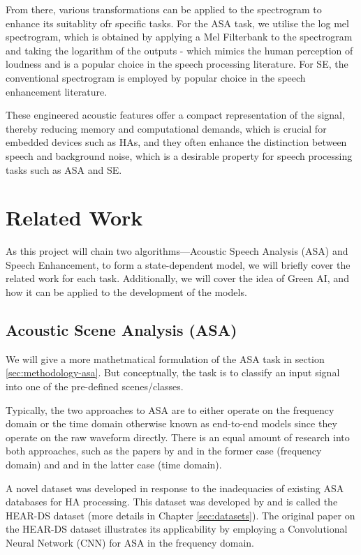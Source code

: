 \documentclass[logo,bsc,singlespacing,parskip,online]{infthesis}
\begin{document}
From there, various transformations can be applied to the spectrogram 
to enhance its suitablity ofr specific tasks. For the ASA task, we utilise the 
log mel spectrogram, which is obtained by applying a Mel Filterbank to the spectrogram 
and taking the logarithm of the outputs - which mimics the human perception 
of loudness and is a popular choice in the speech processing literature. 
For SE, the conventional spectrogram is employed by popular choice in the speech enhancement literature.

These engineered acoustic features offer a compact representation of the signal, thereby 
reducing memory and computational demands, which is crucial for embedded devices such as 
HAs, and they often enhance the distinction between speech and background noise, 
which is a desirable property for speech processing tasks such as ASA and SE.
\section{Related Work}
As this project will chain two algorithms—Acoustic Speech Analysis (ASA) and Speech Enhancement, 
to form a state-dependent model, we will briefly cover the related work for each task.
Additionally, we will cover the idea of Green AI, and how it can be applied to the development of the models.

\subsection{Acoustic Scene Analysis (ASA)}
We will give a more mathetmatical formulation of the ASA task in section \ref{sec:methodology-asa}. 
But conceptually, the task is to classify an input signal into one of the pre-defined scenes/classes.

Typically, the two approaches to ASA are to either 
operate on the frequency domain or the time domain otherwise known as end-to-end models 
since they operate on the raw waveform directly. 
There is an equal amount of research into both approaches, 
such as the papers by \citet{schindler_multi-temporal_2018} and \citet{kim_specmix_2021} 
in the former case (frequency domain) and \citet{dai_very_2016} 
and \citet{kumar_end_2020} in the latter case (time domain).

A novel dataset was developed in response to the inadequacies of existing ASA databases for HA processing. 
This dataset was developed by \citet{Huwel2020HearDS} and is called the HEAR-DS dataset (more details in Chapter \ref{sec:datasets}).
The original paper on the HEAR-DS dataset illustrates its applicability by employing a Convolutional Neural Network (CNN) for ASA 
in the frequency domain. 
\end{document}
